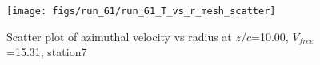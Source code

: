 \begin{figure}[H]
\centering
\texttt{[image: figs/run\_61/run\_61\_T\_vs\_r\_mesh\_scatter]}
\caption{Scatter plot of azimuthal velocity vs radius at $z/c$=10.00, $V_{free}$=15.31, station7}
\label{fig:run_61_T_vs_r_mesh_scatter}
\end{figure}


